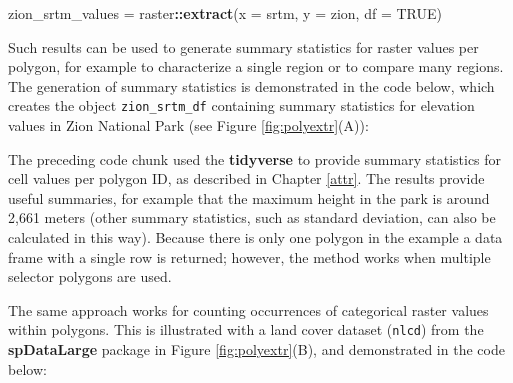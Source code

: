 \documentclass[]{krantz}
\newenvironment{Shaded}{\begin{snugshade}}{\end{snugshade}}
\newcommand{\CommentTok}[1]{\textcolor[rgb]{0.37,0.37,0.37}{\textit{#1}}}
\newcommand{\DataTypeTok}[1]{\textcolor[rgb]{0.27,0.27,0.27}{#1}}
\newcommand{\KeywordTok}[1]{\textcolor[rgb]{0.27,0.27,0.27}{\textbf{#1}}}
\newcommand{\NormalTok}[1]{#1}
\newcommand{\OperatorTok}[1]{\textcolor[rgb]{0.43,0.43,0.43}{\textbf{#1}}}
\newcommand{\OtherTok}[1]{\textcolor[rgb]{0.37,0.37,0.37}{#1}}
\newcommand{\StringTok}[1]{\textcolor[rgb]{0.5,0.5,0.5}{#1}}
\begin{document}
\begin{Shaded}
\begin{Highlighting}[]
\NormalTok{ zion_srtm_values =}\StringTok{ }\NormalTok{raster}\OperatorTok{::}\KeywordTok{extract}\NormalTok{(}\DataTypeTok{x =}\NormalTok{ srtm, }\DataTypeTok{y =}\NormalTok{ zion, }\DataTypeTok{df =} \OtherTok{TRUE}\NormalTok{) }
\end{Highlighting}
\end{Shaded}

Such results can be used to generate summary statistics for raster values per polygon, for example to characterize a single region or to compare many regions.
The generation of summary statistics is demonstrated in the code below, which creates the object \texttt{zion\_srtm\_df} containing summary statistics for elevation values in Zion National Park (see Figure \ref{fig:polyextr}(A)):

\begin{Shaded}
\end{Shaded}

The preceding code chunk used the \textbf{tidyverse} to provide summary statistics for cell values per polygon ID, as described in Chapter \ref{attr}.
The results provide useful summaries, for example that the maximum height in the park is around 2,661 meters (other summary statistics, such as standard deviation, can also be calculated in this way).
Because there is only one polygon in the example a data frame with a single row is returned; however, the method works when multiple selector polygons are used.

The same approach works for counting occurrences of categorical raster values within polygons.
This is illustrated with a land cover dataset (\texttt{nlcd}) from the \textbf{spDataLarge} package in Figure \ref{fig:polyextr}(B), and demonstrated in the code below:
\end{document}
